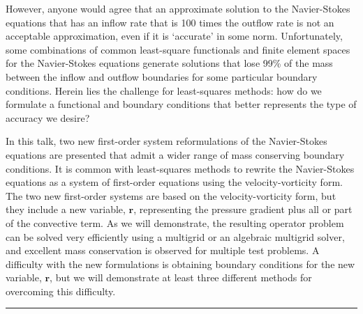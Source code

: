 \documentclass[twosided]{report}
\begin{document}
However, anyone would agree that an approximate solution to
the Navier-Stokes equations that has an inflow rate that is
100 times the outflow rate is not an acceptable
approximation, even if it is `accurate' in some norm.
Unfortunately, some combinations of common least-square
functionals and finite element spaces for the Navier-Stokes
equations generate solutions that lose 99\% of the mass
between the inflow and outflow boundaries for some
particular boundary conditions. Herein lies the challenge
for least-squares methods: how do we formulate a functional
and boundary conditions that better represents the type of
accuracy we desire?

In this talk, two new first-order
system reformulations of the Navier-Stokes equations are
presented that admit a wider range of mass conserving
boundary conditions. It is common with least-squares methods
to rewrite the Navier-Stokes equations as a system of
first-order equations using the velocity-vorticity form. The
two new first-order systems are based on the
velocity-vorticity form, but they include a new variable,
$\mathbf{r}$, representing the pressure gradient plus all
or part of the convective term. As we will demonstrate, the
resulting operator problem can be solved very efficiently
using a multigrid or an algebraic multigrid solver, and
excellent mass conservation is observed for multiple test
problems. A difficulty with the new formulations is
obtaining boundary conditions for the new variable,
$\mathbf{r}$, but we will demonstrate at least three
different methods for overcoming this difficulty.



	\begin{center} \rule{6in}{1pt} \end{center}
\end{document}
